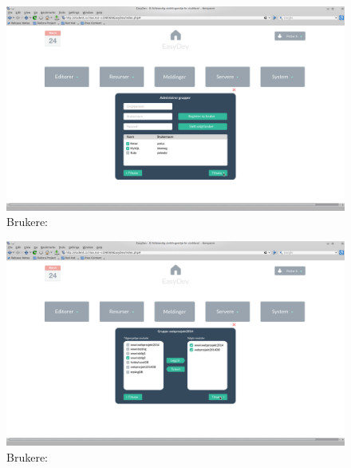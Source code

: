 \begin{figure}[ht]
\includegraphics[width=\textwidth,height=\textheight,keepaspectratio]{./img/prosessdokumentasjon/hifi/b3.png}
\caption{Brukere: }
\label{fig:brukerehi3}
\end{figure}

\begin{figure}[ht]
\includegraphics[width=\textwidth,height=\textheight,keepaspectratio]{./img/prosessdokumentasjon/hifi/b4.png}
\caption{Brukere: }
\label{fig:brukerehi4}
\end{figure}